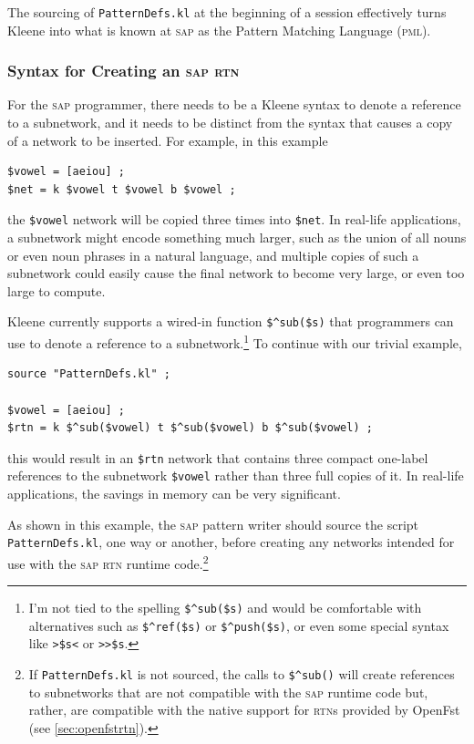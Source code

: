 \documentclass[letterpaper,12pt]{article}
\newcommand{\Kleene}{Kleene\xspace}
\newcommand{\acro}{\textsc}
\begin{document}
The sourcing of \texttt{PatternDefs.kl} at the beginning of a session
effectively turns \Kleene{} into what is known at \acro{sap} as the Pattern
Matching Language (\acro{pml}).

\subsubsection{Syntax for Creating an \acro{sap} \acro{rtn}}

For the \acro{sap} programmer, there needs to be a Kleene syntax to denote a
reference to a subnetwork, and it needs to be distinct from the syntax
that causes a copy of a network to be inserted.  For example, in this
example

\begin{Verbatim}[fontsize=\small]
$vowel = [aeiou] ;
$net = k $vowel t $vowel b $vowel ;
\end{Verbatim}

\noindent
the \verb!$vowel! network will be copied three times into \verb!$net!.  In
real-life applications, a subnetwork might encode something much larger, such
as the union of all nouns or even noun phrases in a natural language, and
multiple copies of such a subnetwork could easily
cause the final network to become very large, or even too large to
compute.

Kleene currently supports a wired-in function \verb!$^sub($s)! that
programmers can use to denote a reference to a subnetwork.\footnote{I'm
not tied to the spelling \verb!$^sub($s)! and would be comfortable with
alternatives such as \verb!$^ref($s)! or \verb!$^push($s)!, or even some
special syntax like \verb!>$s<! or \verb!>>$s!.}  To continue with our
trivial example, 

\begin{Verbatim}[fontsize=\small]
source "PatternDefs.kl" ;

$vowel = [aeiou] ;
$rtn = k $^sub($vowel) t $^sub($vowel) b $^sub($vowel) ;
\end{Verbatim}

\noindent
this would result in an \verb!$rtn! network that contains three compact
one-label references to the subnetwork \verb!$vowel! rather than three
full copies of it.  In real-life applications, the savings in memory can
be very significant.

As shown in this example, the \acro{sap} pattern writer should source the
script \verb!PatternDefs.kl!, one way or another, before creating any
networks intended for use with the \acro{sap} \acro{rtn} runtime
code.\footnote{If \verb!PatternDefs.kl! is not sourced, the calls to
\verb!$^sub()! will create references to subnetworks that are not
compatible with the \acro{sap} runtime code but, rather, are compatible
with the native support for \acro{rtn}s provided by OpenFst (see
\ref{sec:openfstrtn}).}
\end{document}
